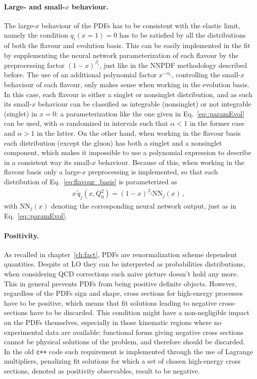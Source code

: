 \paragraph{Large- and small-$x$ behaviour.} 
The large-$x$ behaviour of the PDFs has to be consistent with the elastic limit, namely the condition
$q_i\left(x=1\right)=0$ has to be satisfied by all the distributions of both the flavour and evolution basis.
This can be easily implemented in the fit by supplementing the neural network parameterization of 
each flavour by the preprocessing factor $\left(1-x\right)^{\beta_i}$, just like in the NNPDF methodology
described before.
The use of an additional polynomial factor $x^{-\alpha_i}$, controlling the small-$x$ behaviour of each flavour,
only makes sense when working in the evolution basis. In this case, each flavour is either a singlet or nonsinglet
distribution, and as such its small-$x$ behaviour can be classified as integrable (nonsinglet) or not integrable (singlet)
in $x=0$: a parameterization like the one given in Eq.~\eqref{eq::paramEvol} can be used, with $\alpha$
randomized in intervals such that $\alpha<1$ in the former case and $\alpha>1$ in the latter.
%
On the other hand, when working in the flavour basis each distribution (except the gluon) has both a singlet 
and a nonsinglet component, which makes it impossible to use a polynomial expression 
to describe in a consistent way its small-$x$ behaviour. Because of this, when working in the flavour basis
only a large-$x$ preprocessing is implemented, so that each distribution of Eq.~\eqref{eq:flavour_basis} is
parameterized as
\begin{align}
    x\,\tilde{q}_j\left(x, Q_0^2\right) = \left(1-x\right)^{\beta_{j}}\text{NN}_{j}\left(x\right)\,,
\end{align}
with $\text{NN}_{j}\left(x\right)$ denoting the corresponding neural network output, just as in Eq.~\eqref{eq::paramEvol}.



\paragraph{Positivity.}
As recalled in chapter~\ref{ch:fact}, PDFs are renormalization scheme dependent quantities.
Despite at LO they can be interpreted as probabilities distributions, when considering QCD corrections
such naive picture doesn't hold any more. This in general prevents PDFs from being positive definite objects.
However, regardless of the PDFs sign and shape, cross sections for high-energy processes have to be positive,
which means that fit solutions leading to negative cross-sections have to be discarded.
This condition might have a non-negligible impact on the PDFs themselves, 
especially in those kinematic regions where no experimental
data are available: functional forms giving negative cross sections cannot be 
physical solutions of the problem, and therefore should be discarded.  
In the old {\tt c++} code such requirement is implemented through the use of Lagrange multipliers, 
penalizing fit solutions for which a set of chosen high-energy cross sections,
denoted as positivity observables, result to be negative.

